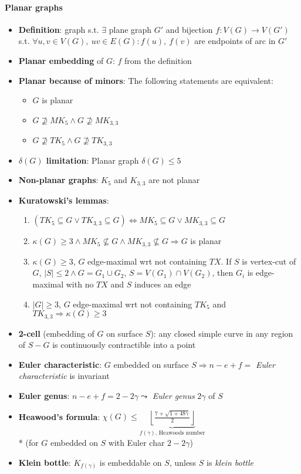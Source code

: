 \paragraph{Planar graphs}
\begin{itemize}
  \item \textbf{Definition}: graph s.t. $ \exists $ plane graph $ G' $ and bijection $ f: V(G) \to V(G') $ s.t. $ \forall u,v \in V(G), \ uv \in E(G) : f(u), \ f(v) $ are endpoints of arc in $ G' $
  \item \textbf{Planar embedding} of $ G $: $ f $ from the definition
  \item \textbf{Planar because of minors}: The following statements are equivalent:
  \begin{itemize}
    \item $ G $ is planar 
    \item $ G \not \supseteq MK_5 \wedge G \not \supseteq MK_{3,3} $
    \item $ G \not \supseteq TK_5 \wedge G \not \supseteq TK_{3,3} $
  \end{itemize}
  \item \textbf{$ \delta(G) $ limitation}: Planar graph $ \delta(G) \leq 5 $
  \item \textbf{Non-planar graphs}: $ K_5 $ and $ K_{3,3} $ are not planar
  \item \textbf{Kuratowski's lemmas}:
  \begin{enumerate}
    \item $ (TK_5 \subseteq G \vee TK_{3,3} \subseteq G) \Leftrightarrow MK_5 \subseteq G \vee MK_{3,3} \subseteq G $ 
    \item $ \kappa(G) \geq 3 \wedge MK_5 \not \subseteq G \wedge MK_{3,3} \not \subseteq G \Rightarrow G $ is planar
    \item $ \kappa(G) \geq 3 $, $ G $ edge-maximal wrt not containing $ TX $. If $ S $ is vertex-cut of $ G $, $ \vert S \vert \leq 2 \wedge G = G_1 \cup G_2 $, $ S = V(G_1) \cap V(G_2) $, then $ G_i $ is edge-maximal with no $ TX $ and $ S $ induces an edge
    \item $ \vert G \vert \geq 3 $, $ G $ edge-maximal wrt not containing $ TK_5 $ and $ TK_{3,3} \Rightarrow \kappa(G) \geq 3 $
  \end{enumerate}
  \item \textbf{2-cell} (embedding of $ G $ on surface $ S $): any closed simple curve in any region of $ S - G $ is continuously contractible into a point
  \item \textbf{Euler characteristic}: $ G $ embedded on surface $ S \Rightarrow n - e + f = $ \emph{Euler characteristic} is invariant
  \item \textbf{Euler genus}: $ n - e + f = 2 - 2 \gamma \leadsto $ \emph{Euler genus} $ 2 \gamma $ of $ S $
  \item \textbf{Heawood's formula}: $ \chi(G) \leq \underbrace{\left\lfloor \frac{7 + \sqrt{1 + 48 \gamma}}{2} \right\rfloor}_{f(\gamma)\text{, Heawoods number}} $ \\* (for $ G $ embedded on $ S $ with Euler char $ 2-2\gamma $)
  \item \textbf{Klein bottle}: $ K_{f(\gamma)} $ is embeddable on $ S $, unless $ S $ is \emph{klein bottle}
\end{itemize}

